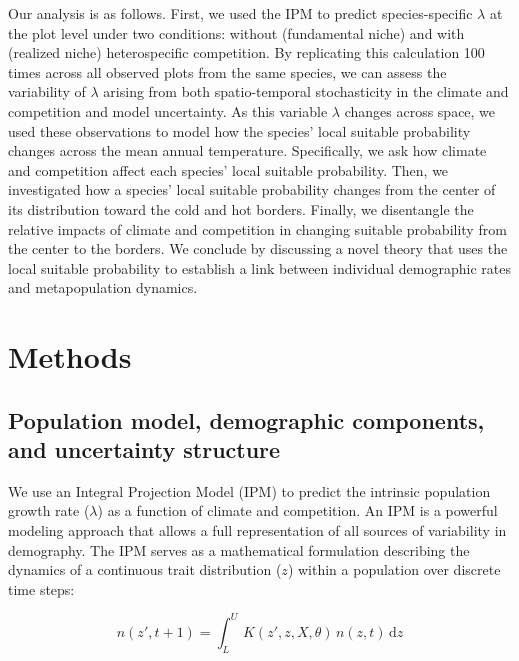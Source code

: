 Our analysis is as follows. First, we used the IPM to predict
species-specific \(\lambda\) at the plot level under two conditions:
without (fundamental niche) and with (realized niche) heterospecific
competition. By replicating this calculation 100 times across all
observed plots from the same species, we can assess the variability of
\(\lambda\) arising from both spatio-temporal stochasticity in the
climate and competition and model uncertainty. As this variable
\(\lambda\) changes across space, we used these observations to model
how the species' local suitable probability changes across the mean
annual temperature. Specifically, we ask how climate and competition
affect each species' local suitable probability. Then, we investigated
how a species' local suitable probability changes from the center of its
distribution toward the cold and hot borders. Finally, we disentangle
the relative impacts of climate and competition in changing suitable
probability from the center to the borders. We conclude by discussing a
novel theory that uses the local suitable probability to establish a
link between individual demographic rates and metapopulation dynamics.

\hypertarget{methods}{%
\section{Methods}\label{methods}}

\hypertarget{population-model-demographic-components-and-uncertainty-structure}{%
\subsection{Population model, demographic components, and uncertainty
structure}\label{population-model-demographic-components-and-uncertainty-structure}}

We use an Integral Projection Model (IPM) to predict the intrinsic
population growth rate (\(\lambda\)) as a function of climate and
competition. An IPM is a powerful modeling approach that allows a full
representation of all sources of variability in demography. The IPM
serves as a mathematical formulation describing the dynamics of a
continuous trait distribution (\(z\)) within a population over discrete
time steps:

\begin{equation}
n(z', t + 1) = \int_{L}^{U} \, K(z', z, X, \theta)\, n(z, t)\, \mathrm{d}z
\label{eq:ipm}\end{equation}


